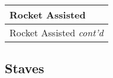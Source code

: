\documentclass[twoside]{book}
\begin{document}
\begin{longtable}{p{1.25in}} 
  Rocket Assisted\\
  \hline
  \hline
  \endfirsthead
  Rocket Assisted \textit{cont'd}
         \\
  \hline
  \endhead

\end{longtable}
    
\begin{multicols}{2}


\hspace{-3.75ex}
\vspace{1ex}


    
\end{multicols}
  
    

\subsection{Staves}
    
\end{document}
